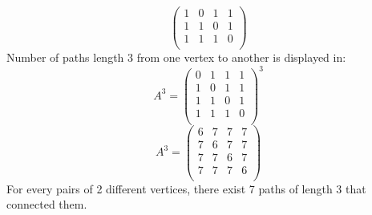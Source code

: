 \documentclass[a4paper]{article}
\begin{document}
\begin{enumerate}[label = \alph*)]
\begin{equation*}
\begin{pmatrix}
				      1 & 0 & 1 & 1 \\
				      1 & 1 & 0 & 1 \\
				      1 & 1 & 1 & 0 \\
			      \end{pmatrix}
		      \end{equation*}
		      Number of paths length 3 from one vertex to another is displayed in:
		      \begin{equation*}
			      A^3=
			      \begin{pmatrix}
				      0 & 1 & 1 & 1 \\
				      1 & 0 & 1 & 1 \\
				      1 & 1 & 0 & 1 \\
				      1 & 1 & 1 & 0 \\
			      \end{pmatrix}^3
		      \end{equation*}
		      \begin{equation*}
			      A^3=
			      \begin{pmatrix}
				      6 & 7 & 7 & 7 \\
				      7 & 6 & 7 & 7 \\
				      7 & 7 & 6 & 7 \\
				      7 & 7 & 7 & 6 \\
			      \end{pmatrix}
		      \end{equation*}
		      For every pairs of 2 different vertices, there exist 7 paths of length 3 that connected them.
	\end{enumerate}
	
	
\end{document}
